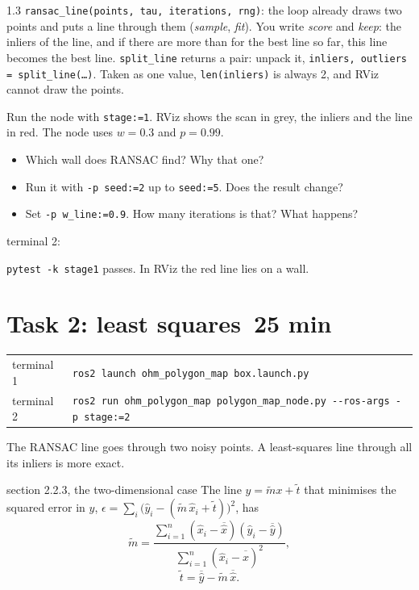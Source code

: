 \documentclass[11pt,a4paper,parskip=half]{scrartcl}
\makeatletter
\newcommand{\thema}[1]{\texttt{#1}}
\newcommand{\minutes}[1]{\hfill{\normalsize\mdseries\color{ohmgrey}\faClock[regular]~#1 min}}
\newcommand{\running}[2]{\begin{tcolorbox}[base, colback=black!3, borderline west={2.5pt}{0pt}{ohmgrey},
        title={\faTerminal~Running}, coltitle=ohmgrey, colbacktitle=black!3, fonttitle=\small\bfseries,
        toptitle=2pt, bottomtitle=0pt, fontupper=\small]
  \begin{tabularx}{\linewidth}{@{}>{\color{ohmgrey}}l >{\raggedright\arraybackslash}X@{}}
    terminal 1 & \texttt{ros2 launch ohm\_polygon\_map box.launch.py#1} \\
    terminal 2 & \texttt{ros2 run ohm\_polygon\_map polygon\_map\_node.py -\kern0pt-ros-args #2}
  \end{tabularx}
\end{tcolorbox}}
\newcommand{\expected}[2][]{\begin{seebox}
  \begin{minipage}[c]{0.36\linewidth}\resizebox{\linewidth}{!}{}\end{minipage}%
  \hfill
  \begin{minipage}[c]{0.615\linewidth}
    {\footnotesize\color{ohmgrey}#1terminal 2:}
    
  \end{minipage}
\end{seebox}}
\makeatother
\begin{document}
\begin{todo}{1.3}
\thema{ransac\_line(points, tau, iterations, rng)}: the loop already draws two points and puts a line
through them (\emph{sample}, \emph{fit}). You write \emph{score} and \emph{keep}: the inliers of the line,
and if there are more than for the best line so far, this line becomes the best line.
\thema{split\_line} returns a pair: unpack it, \thema{inliers, outliers = split\_line(\dots)}. Taken as one
value, \thema{len(inliers)} is always 2, and RViz cannot draw the points.
\end{todo}

Run the node with \thema{stage:=1}. RViz shows the scan in grey, the inliers and the line in red. The node
uses \(w = 0.3\) and \(p = 0.99\).
\begin{itemize}
  \item Which wall does RANSAC find? Why that one?
  \item Run it with \thema{-p seed:=2} up to \thema{seed:=5}. Does the result change?
  \item Set \thema{-p w\_line:=0.9}. How many iterations is that? What happens?
\end{itemize}

\expected[]{stage1}

\begin{checkpoint}
\thema{pytest -k stage1} passes. In RViz the red line lies on a wall.
\end{checkpoint}

\newpage
\section{Task 2: least squares\minutes{25}}
\label{sec:task2}
\running{}{-p stage:=2}

The RANSAC line goes through two noisy points. A least-squares line through all its inliers is more
exact.

\begin{script}{section 2.2.3, the two-dimensional case}
The line \(y = \tilde m x + \tilde t\) that minimises the squared error in \(y\),
\(\epsilon = \sum_i \big(\hat y_i - (\tilde m\,\hat x_i + \tilde t)\big)^2\), has
\begin{equation}
  \tilde m = \frac{\sum\limits_{i=1}^n (\hat x_i - \overline{\hat x})(\hat y_i - \overline{\hat y})}
                  {\sum\limits_{i=1}^n (\hat x_i - \overline{\hat x})^2},
  \tag{2.23}
\end{equation}
\begin{equation}
  \tilde t = \overline{\hat y} - \tilde m\,\overline{\hat x} .
  \tag{2.24}
\end{equation}
\end{script}
\end{document}
